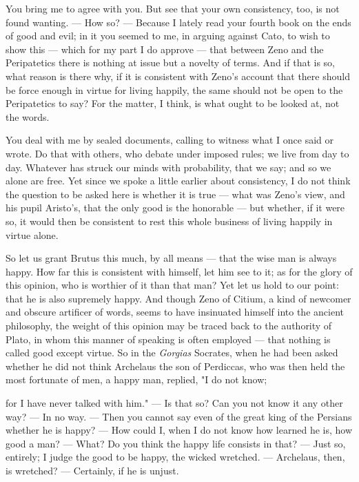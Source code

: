  You bring me to agree with you. But see that your own consistency, too, is not found wanting. — How so? — Because I lately read your fourth book on the ends of good and evil; in it you seemed to me, in arguing against Cato, to wish to show this — which for my part I do approve — that between Zeno and the Peripatetics there is nothing at issue but a novelty of terms. And if that is so, what reason is there why, if it is consistent with Zeno's account that there should be force enough in virtue for living happily, the same should not be open to the Peripatetics to say? For the matter, I think, is what ought to be looked at, not the words.

 You deal with me by sealed documents, calling to witness what I once said or wrote. Do that with others, who debate under imposed rules; we live from day to day. Whatever has struck our minds with probability, that we say; and so we alone are free. Yet since we spoke a little earlier about consistency, I do not think the question to be asked here is whether it is true — what was Zeno's view, and his pupil Aristo's, that the only good is the honorable — but whether, if it were so, it would then be consistent to rest this whole business of living happily in virtue alone.

 So let us grant Brutus this much, by all means — that the wise man is always happy. How far this is consistent with himself, let him see to it; as for the glory of this opinion, who is worthier of it than that man? Yet let us hold to our point: that he is also supremely happy. And though Zeno of Citium, a kind of newcomer and obscure artificer of words, seems to have insinuated himself into the ancient philosophy, the weight of this opinion may be traced back to the authority of Plato, in whom this manner of speaking is often employed — that nothing is called good except virtue. So in the \textit{Gorgias} Socrates, when he had been asked whether he did not think Archelaus the son of Perdiccas, who was then held the most fortunate of men, a happy man, replied, "I do not know;

 for I have never talked with him." — Is that so? Can you not know it any other way? — In no way. — Then you cannot say even of the great king of the Persians whether he is happy? — How could I, when I do not know how learned he is, how good a man? — What? Do you think the happy life consists in that? — Just so, entirely; I judge the good to be happy, the wicked wretched. — Archelaus, then, is wretched? — Certainly, if he is unjust.

